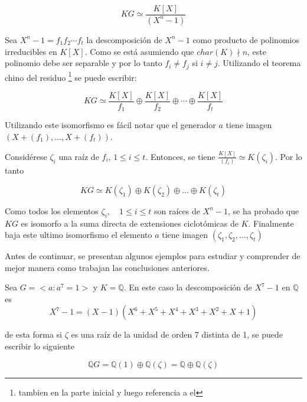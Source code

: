 \[KG \simeq \frac{K[X]}{(X^n -1 )} \]

Sea $ X^n -1 = f_1f_2\cdots f_t$ la descomposición de $X^n -1$ como producto de polinomios irreducibles en $K[X]$. Como se está asumiendo que $char(K) \nmid n$, este polinomio debe ser separable y por lo tanto $f_i \neq f_j$ si $i \neq j$. Utilizando el teorema chino del residuo \footnote{tambien en la parte inicial y luego referencia a el} se puede escribir:

\[KG \simeq \frac{K[X]}{f_1} \oplus \frac{K[X]}{f_2} \oplus \cdots \oplus \frac{K[X]}{f_t} \]


Utilizando este isomorfismo es fácil notar que el generador $a$ tiene imagen $( X + (f_1)  , \dots, X + (f_t) ) $. 

Considérese $\zeta_i$ una raíz de $f_i$, $1 \leq i \leq t$. Entonces, se tiene $\frac{K[X]}{(f_i)} \simeq K(\zeta_i)$. Por lo tanto

\[ KG \simeq K(\zeta_1) \oplus K(\zeta_2) \oplus \dots \oplus K(\zeta_t)  \]

Como todos los elementos $\zeta_i , \quad 1 \leq i \leq t$ son raíces de $X^n -1$, se ha probado que $KG$ es isomorfo a la suma directa de extensiones ciclotómicas de $K$. Finalmente baja este 
ultimo isomorfismo el elemento $a$ tiene imagen $(\zeta_1 , \zeta_2, \dots ,\zeta_t)$

Antes de continuar, se presentan algunos ejemplos para estudiar y comprender de mejor manera como trabajan las conclusiones anteriores.

\begin{ejemplo}
Sea $G = < a \colon a^7 = 1>$ y $K = \mathds{Q} $. 
En este caso la descomposición de $ X^7 -1$ en $\mathds{Q}$ es 
\[ X^7 -1 = (X-1)(X^6 + X^5 + X^4 + X^3 + X^2 + X + 1) \]

de esta forma si $\zeta$ es una raíz de la unidad de orden 7 distinta de 1, se puede escribir lo siguiente

\[  \mathds{Q}G = \mathds{Q}(1) \oplus \mathds{Q}(\zeta) = \mathds{Q} \oplus \mathds{Q}(\zeta)   \]
\end{ejemplo}

